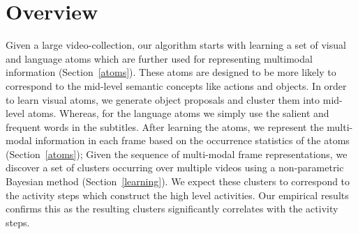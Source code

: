 
\vspace{-1mm}
\section{Overview}
\label{sec:overview}
\vspace{-1mm}


Given a large video-collection, our algorithm starts with learning a set of visual and language atoms which are further used for representing multimodal information (Section~\ref{atoms}). These atoms are designed to be more likely to correspond to the mid-level semantic concepts like actions and objects. In order to learn visual atoms, we generate object proposals and cluster them into mid-level atoms. Whereas, for the language atoms we simply use the salient and frequent words in the subtitles. After learning the atoms, we represent the multi-modal information in each frame based on the occurrence statistics of the atoms (Section~\ref{atoms}); Given the sequence of multi-modal frame representations, we discover a set of clusters occurring over multiple videos using a non-parametric Bayesian method (Section~\ref{learning}). We expect these clusters to correspond to the activity steps which construct the high level activities. Our empirical results confirms this as the resulting clusters significantly correlates with the activity steps.



